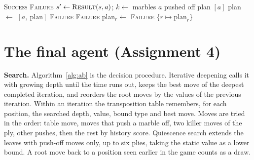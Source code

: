 \documentclass[a4paper,10pt]{article}
\begin{document}
\begin{algorithm}[!htbp]
\caption{AND--OR search for a forced push-off (after AIMA Fig.~4.11)}\label{alg:andor}
\begin{algorithmic}[1]
   \Return \textsc{Success} \EndIf
   \Return \textsc{Failure} \EndIf
    \State $s' \gets \textsc{Result}(s,a)$; $k \gets$ marbles $a$ pushed off
     \Return plan $[a]$ \EndIf
    \State plan $\gets$ 
     \Return $[a,\ \text{plan}]$ \EndIf
  \EndFor
  \State \Return \textsc{Failure}
\EndFunction
{}
     \Return \textsc{Failure} \EndIf
    \State plan$_r \gets$ 
     \Return \textsc{Failure} \EndIf
  \EndFor
  \State \Return $\{r \mapsto \text{plan}_r\}$
\EndFunction
\end{algorithmic}
\end{algorithm}

\section{The final agent (Assignment 4)}

\textbf{Search.} Algorithm~\ref{alg:ab} is the decision procedure. Iterative deepening calls it with growing depth
until the time runs out, keeps the best move of the deepest completed iteration, and reorders the root moves by the
values of the previous iteration. Within an iteration the transposition table remembers, for each position, the
searched depth, value, bound type and best move. Moves are tried in the order: table move, moves that push a marble
off, two killer moves of the ply, other pushes, then the rest by history score. Quiescence search extends the leaves
with push-off moves only, up to six plies, taking the static value as a lower bound. A root move back to a position
seen earlier in the game counts as a draw.
\end{document}
